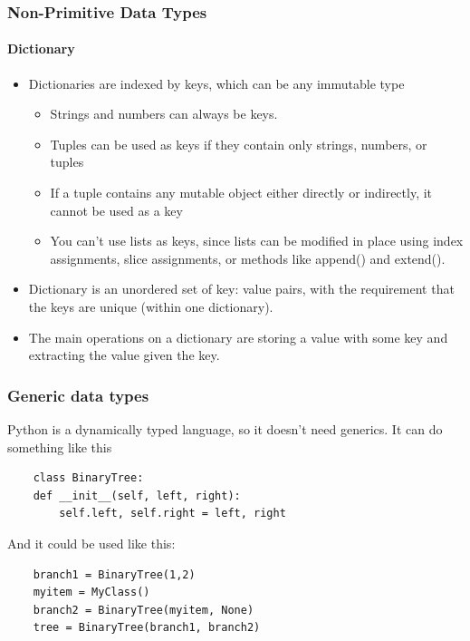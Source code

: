 \documentclass{beamer}
\begin{document}
\begin{frame}[fragile]
\frametitle{Non-Primitive Data Types}
\framesubtitle{Dictionary}

\begin{itemize}
	\item Dictionaries are indexed by keys, which can be any immutable type
		\begin{itemize}
		\item Strings and numbers can always be keys. 
		\item Tuples can be used as keys if they contain only strings, numbers, or tuples
		\item If a tuple contains any mutable object either directly or indirectly, it cannot be used as a key
		\item You can’t use lists as keys, since lists can be modified in place using index assignments, slice assignments, or methods like append() and extend().
		\end{itemize}

	\item Dictionary is an unordered set of key: value pairs, with the requirement that the keys are unique (within one dictionary).
		

	\item The main operations on a dictionary are storing a value with some key and extracting the value given the key.
		
	
		
\end{itemize}


\end{frame}
\begin{frame}[fragile]
\frametitle{Generic data types}
Python is a dynamically typed language, so it doesn't need generics. It can do something like this

\begin{verbatim}
	class BinaryTree:
    def __init__(self, left, right):
        self.left, self.right = left, right
\end{verbatim}
And it could be used like this:
\begin{verbatim}
	branch1 = BinaryTree(1,2)
	myitem = MyClass()
	branch2 = BinaryTree(myitem, None)
	tree = BinaryTree(branch1, branch2)
\end{verbatim}
\framesubtitle{}

\end{frame}

	
\end{document}

